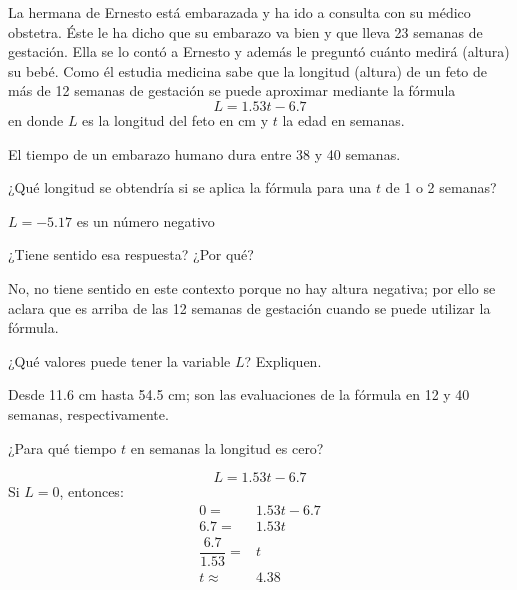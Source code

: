 La hermana de Ernesto está embarazada y ha ido a consulta con su médico obstetra.
Éste le ha dicho que su embarazo va bien y que lleva 23 semanas de gestación.
Ella se lo contó a Ernesto y además le preguntó cuánto medirá (altura) su bebé.
Como él estudia medicina sabe que la longitud (altura) de un feto de más
de 12 semanas de gestación se puede aproximar mediante la fórmula
\label{ques:longitud_emb}
\begin{equation}\label{eq:longitud_emb}
    L = 1.53t - 6.7
\end{equation}
en donde $L$ es la longitud del feto en cm y $t$ la edad en semanas.

\begin{multicols}{2}
    \begin{parts}
        El tiempo de un embarazo humano dura entre 38 y 40 semanas.

        \begin{subparts}
            \subpart ¿Qué longitud se obtendría si se aplica la fórmula para una $t$ de 1 o 2 semanas?

            \begin{solutionbox}{3.5em}
                $L = -5.17$ es un número negativo
            \end{solutionbox}

            \subpart ¿Tiene sentido esa respuesta? ¿Por qué?

            \begin{solutionbox}{7em}
                No, no tiene sentido en este contexto porque
                no hay altura negativa; por ello se aclara que es arriba de las 12 semanas de
                gestación cuando se puede utilizar la fórmula.
            \end{solutionbox}

        \end{subparts}

        ¿Qué valores puede tener la variable $L$? Expliquen.

        \begin{solutionbox}{6em}
            Desde 11.6 cm hasta 54.5 cm; son las evaluaciones de la fórmula en 12 y 40
            semanas, respectivamente.
        \end{solutionbox}

        ¿Para qué tiempo $t$ en semanas la longitud es cero?

        \begin{solutionbox}{14em}
            \[L=1.53t-6.7\]
            Si $L=0$, entonces:
            \begin{align*}
                0=                 & 1.53t-6.7 \\
                6.7=               & 1.53t     \\
                \dfrac{6.7}{1.53}= & t         \\
                t \approx          & 4.38      \\
            \end{align*}


\end{solutionbox}
\end{parts}
\end{multicols}
